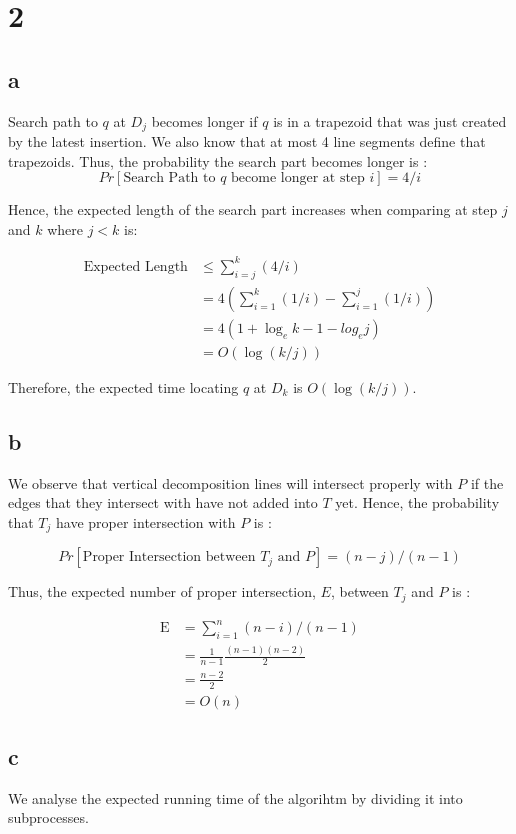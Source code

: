 
\section*{2}
\subsection*{a}
Search path to $q$ at $D_j$ becomes longer if $q$ is in a trapezoid that was just
created by the latest insertion. We also know that at most 4 line segments define
that trapezoids. Thus, the probability the search part becomes longer is :
$$
Pr[\text{Search Path to $q$ become longer at step $i$}] = 4/i
$$

Hence, the expected length of the search part increases when comparing at step $j$ and $k$
where $j<k$ is:

\begin{align*}
    \text{Expected Length} &\leq \sum_{i=j}^{k}( 4/i ) \\
    &= 4( \sum_{i=1}^{k}( 1/i ) -  \sum_{i=1}^{j}( 1/i ) ) \\
    &= 4( 1 + \log_{e}k - 1 - log_{e}j ) \\
    &= O(\log(k/j))
\end{align*}

Therefore, the expected time locating $q$ at $D_k$ is $O(\log(k/j))$.

\subsection*{b}
We observe that vertical decomposition lines will intersect properly with $P$ if 
the edges that they intersect with have not added into $T$ yet. Hence,
the probability that $T_j$ have proper intersection with $P$ is :

$$
Pr[\text{Proper Intersection between $T_j$ and $P$} ] = (n-j)/(n-1)
$$

Thus, the expected number of proper intersection, $E$, between $T_j$ and $P$ is :

\begin{align*}
    \text{E} &= \sum_{i=1}^{n}(n-i)/(n-1) \\
    &= \frac{1}{n-1}\frac{(n-1)(n-2)}{2} \\
    &= \frac{n-2}{2} \\
    &= O(n)
\end{align*}

\subsection*{c}
We analyse the expected running time of the algorihtm by dividing it into subprocesses.

